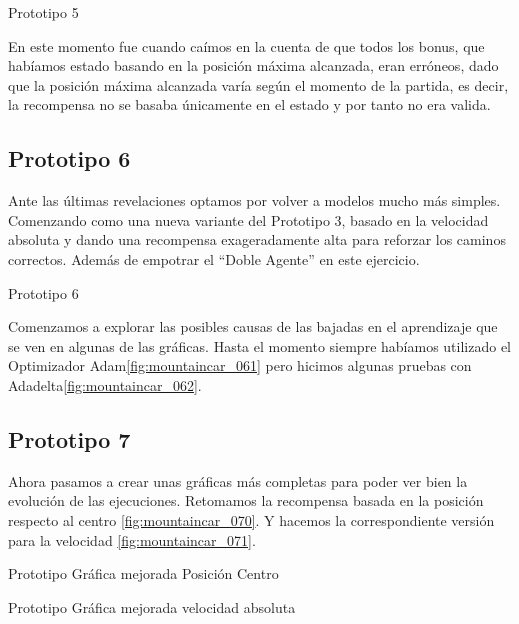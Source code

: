  {Prototipo 5}
 
 En este momento fue cuando caímos en la cuenta de que todos los bonus, que habíamos estado basando en la posición máxima alcanzada, eran erróneos, dado que la posición máxima alcanzada varía según el momento de la partida, es decir, la recompensa no se basaba únicamente en el estado y por tanto no era valida.
 
\subsection{Prototipo 6}
Ante las últimas revelaciones optamos por volver a modelos mucho más simples. Comenzando como una nueva variante del Prototipo 3, basado en la velocidad absoluta y dando una recompensa exageradamente alta para reforzar los caminos correctos. Además de empotrar el ``Doble Agente'' en este ejercicio.

{Prototipo 6}

Comenzamos a explorar las posibles causas de las bajadas en el aprendizaje que se ven en algunas de las gráficas. 
Hasta el momento siempre habíamos utilizado el Optimizador Adam\ref{fig:mountaincar_061} pero hicimos algunas pruebas con Adadelta\ref{fig:mountaincar_062}.

%

%

\subsection{Prototipo 7}
Ahora pasamos a crear unas gráficas más completas para poder ver bien la evolución de las ejecuciones.
Retomamos la recompensa basada en la posición respecto al centro \ref{fig:mountaincar_070}. Y hacemos la correspondiente versión para la velocidad \ref{fig:mountaincar_071}.

%
{Prototipo Gráfica mejorada Posición Centro}

%
{Prototipo Gráfica mejorada velocidad absoluta}

